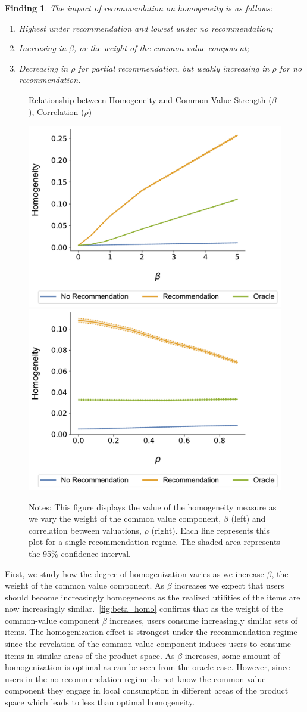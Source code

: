 \documentclass[manuscript, nonacm]{acmart}
\newtheorem{finding}{Finding}
\begin{document}
\begin{finding}\label{finding_homogeneity}
The impact of recommendation on homogeneity is as follows:
\begin{enumerate}
\item Highest under recommendation and lowest under no recommendation;
\item Increasing in $\beta$, or the weight of the common-value component;
\item Decreasing in $\rho$ for partial recommendation, but weakly increasing in $\rho$ for no recommendation.
\end{enumerate}
\end{finding}


\begin{figure}[t]
\caption{Relationship between Homogeneity and Common-Value Strength ($\beta$), Correlation ($\rho$)}
\includegraphics[width=.3\linewidth]{figures/beta_homogeneity_N_200_T_20} \hspace{1.0cm}
\includegraphics[width=.3\linewidth]{figures/rho_homogeneity_N_200_T_20}\label{fig:beta_homo}
\caption*{\scriptsize Notes: This figure displays the value of the homogeneity measure as we vary the weight of the common value component, $\beta$ (left) and correlation between valuations, $\rho$ (right). Each line represents this plot for a single recommendation regime. The shaded area represents the 95\% confidence interval.}
\end{figure}

First, we study how the degree of homogenization varies as we increase $\beta$, the weight of the common value component. As $\beta$ increases we expect that users should become increasingly homogeneous as the realized utilities of the items are now increasingly similar.~\autoref{fig:beta_homo} confirms that as the weight of the common-value component $\beta$ increases, users consume increasingly similar sets of items. The homogenization effect is strongest under the recommendation regime since the revelation of the common-value component induces users to consume items in similar areas of the product space. As $\beta$ increases, some amount of homogenization is optimal as can be seen from the oracle case. However, since users in the no-recommendation regime do not know the common-value component they engage in local consumption in different areas of the product space which leads to less than optimal homogeneity.
\par
\end{document}
